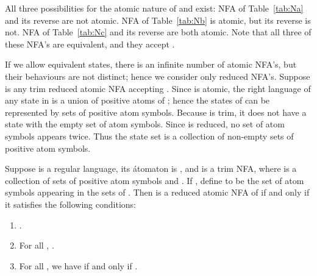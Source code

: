 \documentclass{llncs}
\newcommand{\be}{\begin{enumerate}}
\newcommand{\ee}{\end{enumerate}}
\begin{document}
All three possibilities for the atomic nature of  and  exist:
NFA  of Table~\ref{tab:Na} and its reverse are not atomic.
NFA  of Table~\ref{tab:Nb} is atomic, but its reverse is not.
NFA  of Table~\ref{tab:Nc} and its reverse are both atomic.
Note that all three of these NFA's are equivalent, and they accept .
\begin{table}[t]
\begin{minipage}[b]{0.3\linewidth}
\caption{.}
\label{tab:Na}
\begin{center}

\end{center}
\end{minipage}
\hspace{0.3cm}
\begin{minipage}[b]{0.3\linewidth}
\caption{.}
\label{tab:Nb}
\begin{center}

\end{center}
\end{minipage}
\hspace{0.3cm}
\begin{minipage}[b]{0.3\linewidth}
\caption{.}
\label{tab:Nc}
\begin{center}

\end{center}
\end{minipage}

\end{table}


If we allow equivalent states, there is an infinite number of atomic NFA's, 
but their behaviours are not distinct; hence we consider only reduced NFA's.
Suppose  is any trim reduced atomic NFA accepting .
Since  is atomic, the right language of any state in  is a union of positive atoms
of ; hence the states of  can be represented by sets of positive atom symbols.
Because  is trim, it does not have a state with the empty set of atom symbols.
Since  is reduced, no set of atom symbols appears twice.
Thus the state set  is a collection of non-empty sets of positive atom symbols.


\begin{theorem}[Legality]
\label{thm:unions}
Suppose  is a regular language,  its \'atomaton is
, and
 is a trim NFA, where 
 is a collection of sets of positive atom symbols and 
.
If , define 
 to be the set of atom symbols 
appearing in the sets   of . 
Then  is a reduced atomic NFA of  if and only if it satisfies the following
conditions:
\be
\item
\label{cond:in}
.
\item
\label{cond:trans}
For all , .
\item
\label{cond:out}
For all , we have  if and only if 
.
\ee
\end{theorem}
\end{document}
